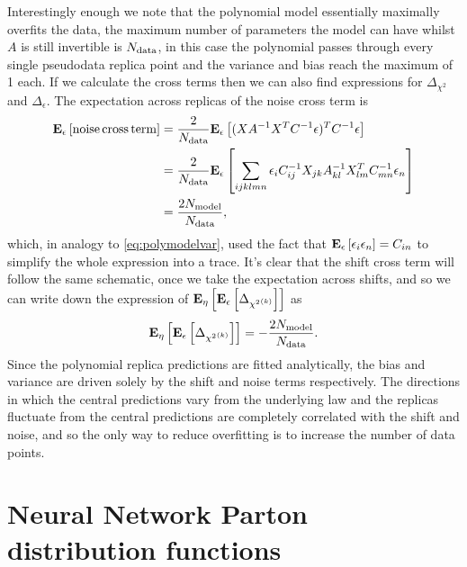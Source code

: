 Interestingly enough we note that the polynomial model
essentially maximally overfits the data, the maximum number of parameters the
model can have whilst $A$ is still invertible is $N_{\rm data}$, in this case the
polynomial passes through every single pseudodata replica point and the
variance and bias reach the maximum of 1 each. If we calculate the cross terms
then we can also find expressions for $\Delta_{\chi^2}$ and $\Delta_\epsilon$.
The expectation across replicas of the noise cross term is
\begin{equation}
    \begin{split}
        \mathbf{E}_{\epsilon}\left[ {\rm noise \, cross \, term} \right] &= \frac{2}{N_{\rm data}}\mathbf{E}_{\epsilon}\left[ (X A^{-1} X^T C^{-1}_{} \mathbf{\epsilon})^T C^{-1}_{} \epsilon \right] \\
        &= \frac{2}{N_{\rm data}} \mathbf{E}_{\epsilon}\left[ \sum_{ijklmn} \epsilon_i C^{-1}_{ij} X_{jk} A^{-1}_{kl} X^T_{lm} C^{-1}_{mn} \epsilon_n  \right] \\
        &= \frac{2 N_{\rm model}}{N_{\rm data}},
    \end{split}
\end{equation}
which, in analogy to \eqref{eq:polymodelvar}, used the fact that
$\mathbf{E}_{\epsilon}\left[ \epsilon_i \epsilon_{n} \right] = C_{in}$ to simplify the whole expression into
a trace. It's clear that the shift cross term will follow the same schematic,
once we take the expectation across shifts, and so we can write down the
expression of $\mathbf{E}_{\eta}\left[ \mathbf{E}_{\epsilon}\left[ \Delta_{{\chi^2}^{(k)}} \right] \right]$ as
\begin{equation}
    \mathbf{E}_{\eta}\left[ \mathbf{E}_{\epsilon}\left[ \Delta_{{\chi^2}^{(k)}} \right] \right] = - \frac{2 N_{\rm model}}{N_{\rm data}}.
\end{equation}
Since the polynomial replica predictions are fitted analytically, the bias
and variance are driven solely by the shift and noise terms respectively. The
directions in which the central predictions vary from the underlying law and
the replicas fluctuate from the central predictions are completely correlated
with the shift and noise, and so the only way to reduce overfitting is to
increase the number of data points.

\section{Neural Network Parton distribution functions}

